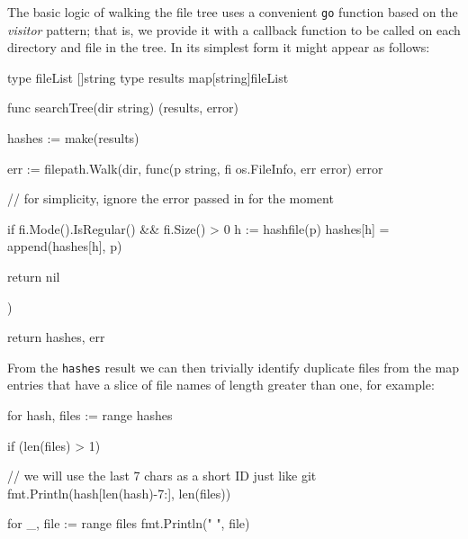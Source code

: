 \documentclass[12pt,notitlepage]{article}
\begin{document}

The basic logic of walking the file tree uses a convenient \verb|go| function
based on the {\em visitor} pattern; that is, we provide it with a callback
function to be called on each directory and file in the tree. In its simplest
form it might appear as follows:

\begin{golang}
type fileList []string
type results map[string]fileList

func searchTree(dir string) (results, error) {
	hashes := make(results)

	err := filepath.Walk(dir, func(p string, fi os.FileInfo, err error) error {
        // for simplicity, ignore the error passed in for the moment

		if fi.Mode().IsRegular() && fi.Size() > 0 {
			h := hashfile(p)
			hashes[h] = append(hashes[h], p)
		}

		return nil
	})

	return hashes, err
}
\end{golang}

From the \verb|hashes| result we can then trivially identify duplicate files
from the map entries that have a slice of file names of length greater than one,
for example:

\begin{golang}
	for hash, files := range hashes {
		if (len(files) > 1) {
            // we will use the last 7 chars as a short ID just like git
			fmt.Println(hash[len(hash)-7:], len(files))

			for _, file := range files {
				fmt.Println("   ", file)
			}
		}
	}
\end{golang}
\end{document}
